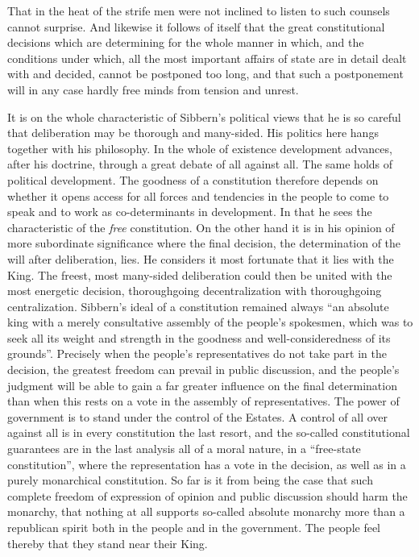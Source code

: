 \documentclass[12pt,a4paper,openany]{book}
\newcommand{\opage}[1]{\marginnote{\footnotesize\textit{[#1]}}}
\begin{document}
That in the heat of the strife men were not inclined to listen
to such counsels cannot surprise. And likewise it follows
of itself that the great constitutional decisions which are
determining for the whole manner in which, and the conditions
under which, all the most important affairs of state are in detail
dealt with and decided, cannot be postponed too long, and that such
a postponement will in any case hardly free minds from
tension and unrest.

It is on the whole characteristic of Sibbern's political
views that he is so careful that deliberation
may be thorough and many-sided. His politics here hangs together
with his philosophy. In the whole of existence development advances, after
his doctrine, through a great debate of all against all.
The same holds of political development.
The goodness of a constitution therefore depends on whether it opens
access for all forces and tendencies in the people to come
to speak and to work as co-determinants in development. In that
he sees the characteristic of the \emph{free} constitution. On the other hand
it is in his opinion of more subordinate significance where
the final decision, the determination of the will after deliberation,
\opage{100}lies. He considers it most fortunate that it lies with the King.
The freest, most many-sided deliberation could then be united
with the most energetic decision, thoroughgoing
decentralization with thoroughgoing centralization. Sibbern's
ideal of a constitution remained always ``an
absolute king with a merely consultative assembly of the people's spokesmen,
which was to seek all its weight and strength in the goodness and
well-consideredness of its grounds''. Precisely when the people's representatives do not
take part in the decision, the greatest freedom can prevail in
public discussion, and the people's judgment will be able to gain
a far greater influence on the final determination than
when this rests on a vote in the assembly of
representatives. The power of government is to stand under the control of the Estates.
A control of all over against all is in every constitution
the last resort, and the so-called constitutional guarantees are in the
last analysis all of a moral nature, in a
``free-state constitution'', where the representation has a vote in the decision,
as well as in a purely monarchical constitution. So far
is it from being the case that such complete freedom of expression of opinion
and public discussion should harm the monarchy, that nothing
at all supports so-called absolute monarchy more than
a republican spirit both in the people and in the government. The people feel
thereby that they stand near their King.
\end{document}
